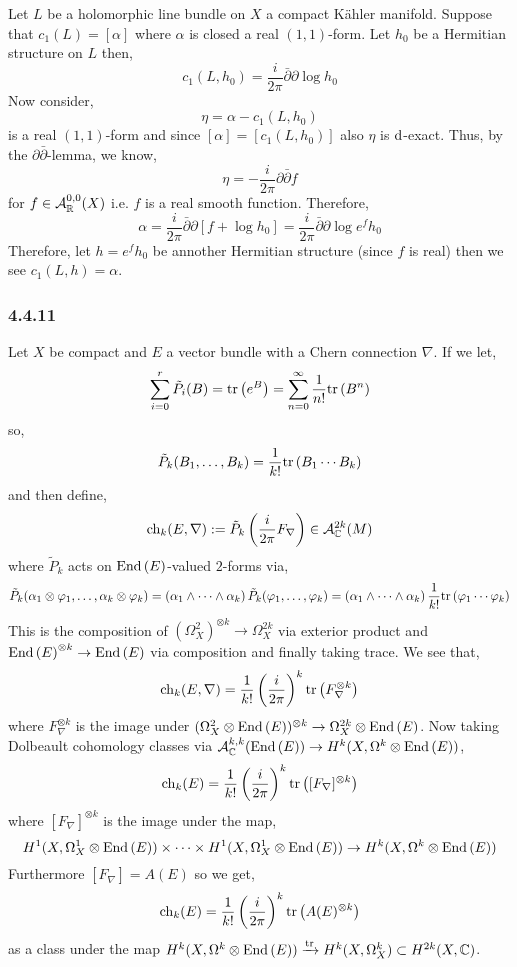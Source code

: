 \documentclass[12pt]{article}
\begin{document}
Let $L$ be a holomorphic line bundle on $X$ a compact K\"{a}hler manifold. Suppose that $c_1(L) = [\alpha]$ where $\alpha$ is closed a real $(1,1)$-form. Let $h_0$ be a Hermitian structure on $L$ then,
\[ c_1(L, h_0) = \frac{i}{2 \pi} \bar{\partial} \partial \log{h_0} \]
Now consider,
\[ \eta = \alpha - c_1(L, h_0) \]
is a real $(1,1)$-form and since $[\alpha] = [c_1(L, h_0)]$ also $\eta$ is $\mathrm{d}$-exact. Thus, by the $\partial \bar{\partial}$-lemma, we know,
\[ \eta = - \frac{i}{2 \pi} \partial \bar{\partial} f \]
for $f \in \mathcal{A}^{0, 0}_{\mathbb{R}}(X)$ i.e. $f$ is a real smooth function. Therefore,
\[ \alpha = \frac{i}{2 \pi} \bar{\partial} \partial \left[ f + \log{h_0} \right] = \frac{i}{2 \pi} \bar{\partial} \partial \log{e^f h_0} \]
Therefore, let $h = e^f h_0$ be annother Hermitian structure (since $f$ is real) then we see $c_1(L, h) = \alpha$.

\subsubsection{4.4.11}

Let $X$ be compact \kahler and $E$ a vector bundle with a Chern connection $\nabla$. If we let,
\[ \sum_{i = 0}^r \tilde{P}_i(B) = \mathrm{tr}\left( e^B \right) = \sum_{n = 0}^\infty \frac{1}{n!} \mathrm{tr}\left( B^n \right)  \]
so,
\[ \tilde{P}_k(B_1, \dots, B_k) = \frac{1}{k!} \mathrm{tr}\left( B_1 \cdots B_k \right) \] 
and then define,
\[ \mathrm{ch}_k(E,\nabla) := \tilde{P}_k \left( \frac{i}{2 \pi} F_\nabla \right) \in \mathcal{A}_{\mathbb{C}}^{2k}(M) \]
where $\tilde{P}_k$ acts on $\mathrm{End} \left( E \right)$-valued $2$-forms via,
\[ \tilde{P}_k(\alpha_1 \otimes \varphi_1, \dots, \alpha_k \otimes \varphi_k) = (\alpha_1 \wedge \cdots \wedge \alpha_k) \, \tilde{P}_k(\varphi_1, \dots, \varphi
_k) = (\alpha_1 \wedge \cdots \wedge \alpha_k) \, \frac{1}{k!} \mathrm{tr}\left( \varphi_1 \cdots \varphi_k \right) \]
This is the composition of $(\Omega_X^2)^{\otimes k} \to \Omega_X^{2k}$ via exterior product and $\mathrm{End} \left( E \right)^{\otimes k} \to \mathrm{End} \left( E \right)$ via composition and finally taking trace. We see that,
\[ \mathrm{ch}_k(E, \nabla) = \frac{1}{k!} \left( \frac{i}{2 \pi} \right)^k \mathrm{tr}\left( F_\nabla^{\otimes k} \right) \]
where $F_\nabla^{\otimes k}$ is the image under $(\Omega_X^2 \otimes \mathrm{End} \left( E \right))^{\otimes k} \to \Omega_X^{2k} \otimes \mathrm{End} \left( E \right)$. Now taking Dolbeault  cohomology classes via $\mathcal{A}^{k,k}_{\mathbb{C}}(\mathrm{End} \left( E \right)) \to H^k(X, \Omega^k \otimes \mathrm{End} \left( E \right))$,
\[ \mathrm{ch}_k(E) = \frac{1}{k!} \left( \frac{i}{2 \pi} \right)^k \mathrm{tr}\left( [F_\nabla]^{\otimes k} \right) \]
where $[F_\nabla]^{\otimes k}$ is the image under the map,
\[ H^1(X, \Omega^1_X \otimes \mathrm{End} \left( E \right)) \times \cdots \times H^1(X, \Omega^1_X \otimes \mathrm{End} \left( E \right)) \to H^{k}(X, \Omega^k \otimes \mathrm{End} \left( E \right)) \]
Furthermore $[F_\nabla] = A(E)$ so we get,
\[ \mathrm{ch}_k(E) = \frac{1}{k!} \left( \frac{i}{2 \pi} \right)^k \mathrm{tr}\left( A(E)^{\otimes k} \right) \]
as a class under the map $H^k(X, \Omega^k \otimes \mathrm{End} \left( E \right)) \xrightarrow{\mathrm{tr}} H^k(X, \Omega^k_X) \subset H^{2k}(X, \mathbb{C})$.
\end{document}
